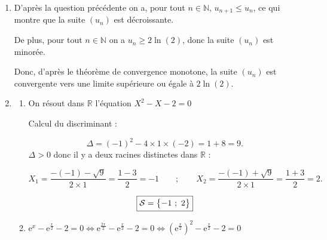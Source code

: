 \documentclass[10pt]{article}
\providecommand{\R}{\mathbb{R}}
\providecommand{\N}{\mathbb{N}}
\begin{document}
\begin{enumerate}

	\item D'après la question précédente on a, pour tout $n \in \N$, $u_{n+1} \leqslant u_{n}$, ce qui montre que la suite $\left(u_{n}\right)$ est décroissante.

De plus, pour tout $n \in \N$ on a $u_{n} \geqslant 2\ln(2)$, donc la suite $\left(u_{n}\right)$ est minorée.
	
Donc, d'après le théorème de convergence monotone, la suite $\left(u_{n}\right)$ est convergente vers une limite supérieure ou égale à $2\ln(2)$.
	\item
	\begin{enumerate}
		\item On résout dans $\R$ l'équation $X^{2} - X - 2 = 0$

Calcul du discriminant :

\[\Delta = (-1)^{2} - 4 \times 1 \times (-2) = 1 + 8 = \boxed{9}.\]
$\Delta > 0$ donc il y a deux racines distinctes dans $\R$ :

\[X_{1} = \dfrac{-(-1) - \sqrt{9}}{2 \times 1} = \dfrac{1-3}{2} = -1 \qquad ; \qquad X_{2} = \dfrac{-(-1) + \sqrt{9}}{2 \times 1} = \dfrac{1+3}{2} = 2.\]

		\[\boxed{\mathcal{S} = \left\{-1~;~2 \strut\right\}}\]

		\item \quad $\text{e}^{x} - \text{e}^{\frac{x}{2}} - 2 = 0 \iff \text{e}^{\frac{2x}{2}} - \text{e}^{\frac{x}{2}} - 2 = 0 \iff \left(\text{e}^{\frac{x}{2}}\right)^{2} - \text{e}^{\frac{x}{2}} - 2 = 0$


\end{enumerate}
\end{enumerate}
\end{document}
